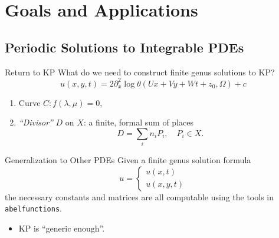 \documentclass{beamer}
\begin{document}
\section{Goals and Applications}

\subsection{Periodic Solutions to Integrable PDEs}



\begin{frame}{Return to KP}{}
What do we need to construct finite genus solutions to KP?
\[
  u(x,y,t) = 2 \partial_x^2 \log \theta(Ux + Vy + Wt + z_0, \Omega) + c
\]
\begin{enumerate}
  \item<2-> Curve $C : f(\lambda,\mu) = 0$,
  \item<3-> {\it ``Divisor''} $D$ on $X$: a finite, formal sum of places
    \[
    D = \sum_i n_i P_i, \quad P_i \in X.
    \]
\end{enumerate}

\end{frame}



\begin{frame}{Generalization to Other PDEs}{}
  Given a finite genus solution formula
  \[
      u = \left\{
      \begin{array}{l}
        u(x,t) \\
        u(x,y,t)
      \end{array}
      \right.
  \]
  the necessary constants and matrices are all computable using the
  tools in {\tt abelfunctions}.
  \begin{itemize}
    \item KP is ``generic enough''.
  \end{itemize}

  \vspace{16pt}

\end{frame}
\end{document}
